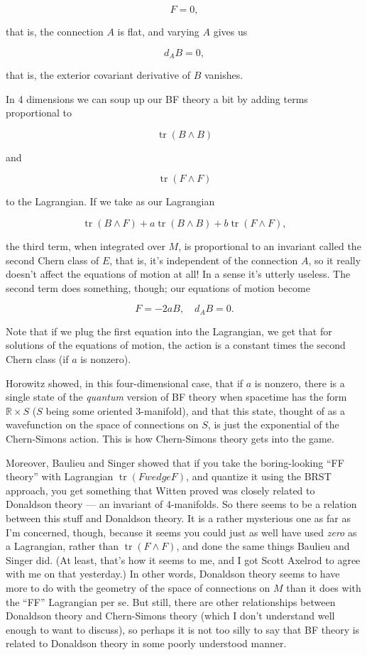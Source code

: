 \documentclass{article}
\begin{document}
\[F = 0,\]

that is, the connection \(A\) is flat, and varying \(A\) gives us

\[d_A B = 0,\]

that is, the exterior covariant derivative of \(B\) vanishes.

In 4 dimensions we can soup up our BF theory a bit by adding terms
proportional to

\[\operatorname{tr}(B \wedge B)\]

and

\[\operatorname{tr}(F \wedge F)\]

to the Lagrangian. If we take as our Lagrangian

\[\operatorname{tr}(B \wedge F) + a \operatorname{tr}(B \wedge B) + b \operatorname{tr}(F \wedge F),\]

the third term, when integrated over \(M\), is proportional to an
invariant called the second Chern class of \(E\), that is, it's
independent of the connection \(A\), so it really doesn't affect the
equations of motion at all! In a sense it's utterly useless. The second
term does something, though; our equations of motion become

\[F = -2aB, \quad d_A B = 0.\]

Note that if we plug the first equation into the Lagrangian, we get that
for solutions of the equations of motion, the action is a constant times
the second Chern class (if \(a\) is nonzero).

Horowitz showed, in this four-dimensional case, that if \(a\) is
nonzero, there is a single state of the \emph{quantum} version of BF
theory when spacetime has the form \(\mathbb{R} \times S\) (\(S\) being
some oriented 3-manifold), and that this state, thought of as a
wavefunction on the space of connections on \(S\), is just the
exponential of the Chern-Simons action. This is how Chern-Simons theory
gets into the game.

Moreover, Baulieu and Singer showed that if you take the boring-looking
``FF theory'' with Lagrangian \(\operatorname{tr}(F wedge F)\), and
quantize it using the BRST approach, you get something that Witten
proved was closely related to Donaldson theory --- an invariant of
4-manifolds. So there seems to be a relation between this stuff and
Donaldson theory. It is a rather mysterious one as far as I'm concerned,
though, because it seems you could just as well have used \emph{zero} as
a Lagrangian, rather than \(\operatorname{tr}(F \wedge F)\), and done
the same things Baulieu and Singer did. (At least, that's how it seems
to me, and I got Scott Axelrod to agree with me on that yesterday.) In
other words, Donaldson theory seems to have more to do with the geometry
of the space of connections on \(M\) than it does with the ``FF''
Lagrangian per se. But still, there are other relationships between
Donaldson theory and Chern-Simons theory (which I don't understand well
enough to want to discuss), so perhaps it is not too silly to say that
BF theory is related to Donaldson theory in some poorly understood
manner.
\end{document}
